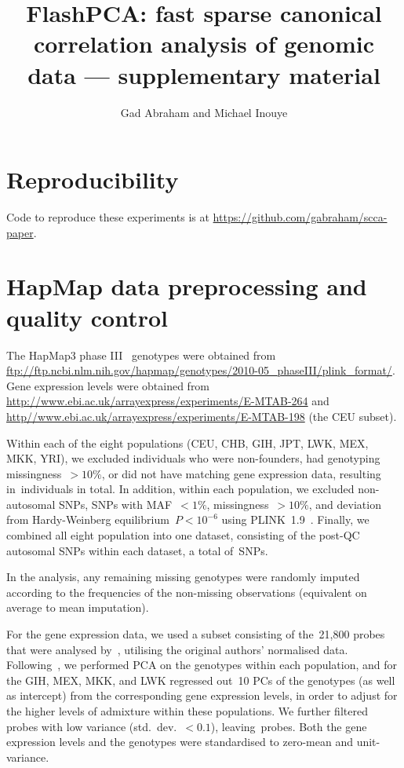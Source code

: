 \documentclass[a4paper,10pt]{article}
\author{Gad Abraham and Michael Inouye}
\title{FlashPCA: fast sparse canonical correlation analysis of genomic data
--- supplementary material}
\begin{document}
\maketitle

\section{Reproducibility}

Code to reproduce these experiments is at
\url{https://github.com/gabraham/scca-paper}.

\section{HapMap data preprocessing and quality control}

The HapMap3 phase III~\citep{hapmap2010} genotypes were obtained from
\url{ftp://ftp.ncbi.nlm.nih.gov/hapmap/genotypes/2010-05_phaseIII/plink_format/}.
Gene expression levels were obtained from
\url{http://www.ebi.ac.uk/arrayexpress/experiments/E-MTAB-264} and
\url{http//www.ebi.ac.uk/arrayexpress/experiments/E-MTAB-198} (the CEU subset).

Within each of the eight populations (CEU, CHB, GIH, JPT, LWK, MEX,
MKK, YRI), we excluded individuals who were non-founders, had genotyping
missingness~${>}10\%$, or did not have matching gene expression data, resulting
in~\nindiv individuals in total. In addition, within each population, we
excluded non-autosomal SNPs, SNPs with MAF~${<}1\%$, missingness~${>}10\%$,
and deviation from Hardy-Weinberg equilibrium~$P{<}10^{-6}$ using
PLINK~1.9~\citep{purcell2007,Chang2015}.  Finally, we combined all eight
population into one dataset, consisting of the post-QC autosomal SNPs within
each dataset, a total of~\nsnps SNPs.

In the analysis, any remaining missing genotypes were randomly imputed
according to the frequencies of the non-missing observations (equivalent on
average to mean imputation).

For the gene expression data, we used a subset consisting of the~21,800 probes
that were analysed by~\citep{Stranger2012}, utilising the original authors'
normalised data. Following~\citep{Stranger2012}, we performed PCA on the
genotypes within each population, and for the GIH, MEX, MKK, and LWK regressed
out~10 PCs of the genotypes (as well as intercept) from the corresponding gene
expression levels, in order to adjust for the higher levels of admixture within
these populations.  We further filtered probes with low variance
(std.~dev.~${<}0.1$), leaving~\ngenes probes. Both the gene expression levels and
the genotypes were standardised to zero-mean and unit-variance.
\end{document}
